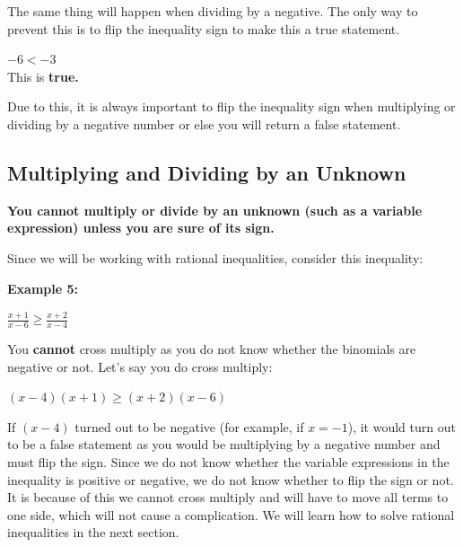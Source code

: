 \documentclass[12pt,fleqn]{book} %
\begin{document}
\noindent The same thing will happen when dividing by a negative. The only way to prevent this is to flip the inequality sign to make this a true statement.
\begin{center}
    $-6<-3$\\
    This is \textbf{true.}\\
\end{center}
\noindent Due to this, it is always important to flip the inequality sign when multiplying or dividing by a negative number or else you will return a false statement.


\subsection{Multiplying and Dividing by an Unknown}

\begin{center}
    \textbf{You cannot multiply or divide by an unknown (such as a variable expression) unless you are sure of its sign.}\\
\end{center}

\noindent Since we will be working with rational inequalities, consider this inequality:

\noindent \textbf{Example 5:}

\begin{center}
    \LARGE{\textbf{$\frac{x+1}{x-6}\geq\frac{x+2}{x-4}$}}
\end{center}

\noindent You \textbf{cannot} cross multiply as you do not know whether the binomials are negative or not. Let's say you do cross multiply:

\begin{center}
\large{\textbf{$(x-4)(x+1)\geq(x+2)(x-6)$}}\\
\end{center}

\noindent If $(x-4)$ turned out to be negative (for example, if $x = -1$), it would turn out to be a false statement as you would be multiplying by a negative number and must flip the sign. Since we do not know whether the variable expressions in the inequality is positive or negative, we do not know whether to flip the sign or not. It is because of this we cannot cross multiply and will have to move all terms to one side, which will not cause a complication. We will learn how to solve rational inequalities in the next section.\\
\pagebreak
\end{document}
